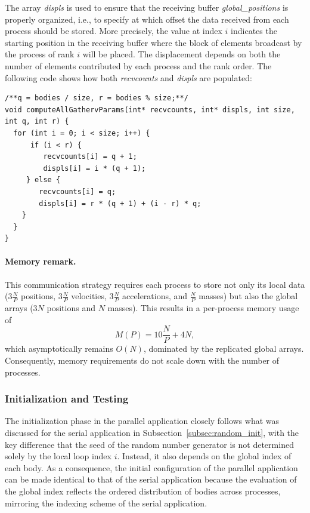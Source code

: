 \documentclass{article}
\begin{document}
The array \emph{displs} is used to ensure that the receiving buffer \emph{global\_positions} is properly organized, i.e., to specify at which offset the data received from each process should be stored.
More precisely, the value at index $i$ indicates the starting position in the receiving buffer where the block of elements broadcast by the process of rank $i$ will be placed. The displacement depends on both the number of elements contributed by each process and the rank order.
The following code shows how both \emph{recvcounts} and \emph{displs} are populated:
\begin{lstlisting}
/**q = bodies / size, r = bodies % size;**/
void computeAllGathervParams(int* recvcounts, int* displs, int size, int q, int r) {
  for (int i = 0; i < size; i++) {
      if (i < r) {
         recvcounts[i] = q + 1;
         displs[i] = i * (q + 1);
     } else {
        recvcounts[i] = q;
        displs[i] = r * (q + 1) + (i - r) * q;
    }
  }
}
\end{lstlisting}

\paragraph{Memory remark.}
This communication strategy requires each process to store not only its local data ($3\frac{N}{P}$ positions, $3\frac{N}{P}$ velocities, $3\frac{N}{P}$ accelerations, and $\tfrac{N}{P}$ masses) but also the global arrays ($3N$ positions and $N$ masses).  
This results in a per-process memory usage of
\[
M(P) = 10\frac{N}{P} + 4N,
\]
which asymptotically remains $O(N)$, dominated by the replicated global arrays.
Consequently, memory requirements do not scale down with the number of processes.

\subsubsection{Initialization and Testing}
The initialization phase in the parallel application closely follows what was discussed for the serial application in Subsection~\ref{subsec:random_init}, with the key difference that the seed of the random number generator is not determined solely by the local loop index $i$. Instead, it also depends on the global index of each body.
As a consequence, the initial configuration of the parallel application can be made identical to that of the serial application because the evaluation of the global index reflects the ordered distribution of bodies across processes, mirroring the indexing scheme of the serial application.
 
\end{document}
